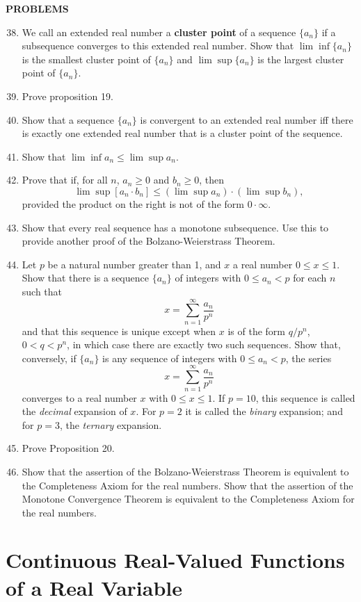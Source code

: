 \begin{center}
	\textbf{PROBLEMS}
\end{center}
\begin{enumerate}
	\setcounter{enumi}{37}
	\item We call an extended real number a \textbf{cluster point} of a sequence $\{ a_n\}$ if a subsequence converges to this extended real number. Show that $\lim \inf \{a_n\}$ is the smallest cluster point of $\{a_n\}$ and $\lim \sup \{a_n\}$ is the largest cluster point of $\{a_n\}$.
	\item Prove proposition 19.
	\item Show that a sequence $\{a_n\}$ is convergent to an extended real number iff there is exactly one extended real number that is a cluster point of the sequence.
	\item Show that $\lim \inf a_n \le \lim \sup a_n$.
	\item Prove that if, for all $n$, $a_n \ge 0$ and $b_n \ge 0 $, then \[ \lim \sup [a_n \cdot b_n] \le (\lim \sup a_n) \cdot (\lim \sup b_n),\] provided the product on the right is not of the form $0 \cdot \infty.$
	\item Show that every real sequence has a monotone subsequence. Use this to provide another proof of the Bolzano-Weierstrass Theorem.
	\item Let $p$ be a natural number greater than 1, and $x$ a real number $0 \le x \le 1.$ Show that there is a sequence $\{a_n\}$ of integers with $0 \le a_n < p$ for each $n$ such that \[ x = \sum_{n=1}^\infty\dfrac{a_n}{p^n} \] 
	and that this sequence is unique except when $x$ is of the form $q/p^n$, $0<q<p^n$, in which case there are exactly two such sequences. Show that, conversely, if $\{a_n\}$ is any sequence of integers with $0\le a_n < p$, the series \[ x = \sum_{n=1}^\infty\dfrac{a_n}{p^n} \] 
	converges to a real number $x$ with $0 \le x \le 1$. If $p = 10$, this sequence is called the \textit{decimal} expansion of $x$. For $p=2$ it is called the \textit{binary} expansion; and for $p=3$, the \textit{ternary} expansion.
	\item Prove Proposition 20.
	\item Show that the assertion of the Bolzano-Weierstrass Theorem is equivalent to the Completeness Axiom for the real numbers. Show that the assertion of the Monotone Convergence Theorem is equivalent to the Completeness Axiom for the real numbers.
\end{enumerate}

\section{Continuous Real-Valued Functions of a Real Variable}

